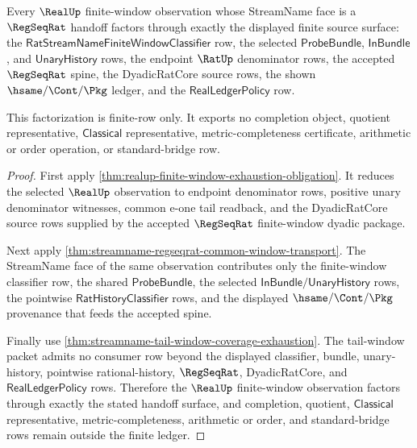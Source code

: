 \begin{theorem}
\label{thm:realup-streamname-regseqrat-dyadic-handoff-exhaustion}
Every $\RealUp$ finite-window observation whose StreamName face is a
$\RegSeqRat$ handoff factors through exactly the displayed finite source
surface: the $\mathsf{RatStreamNameFiniteWindowClassifier}$ row, the selected
$\mathsf{ProbeBundle}$, $\mathsf{InBundle}$, and $\mathsf{UnaryHistory}$ rows,
the endpoint $\RatUp$ denominator rows, the accepted $\RegSeqRat$ spine, the
DyadicRatCore source rows, the shown $\hsame/\Cont/\Pkg$ ledger, and the
$\mathsf{RealLedgerPolicy}$ row.

This factorization is finite-row only. It exports no completion object,
quotient representative, $\mathsf{Classical}$ representative,
metric-completeness certificate, arithmetic or order operation, or
standard-bridge row.
\end{theorem}
\begin{proof}
First apply \autoref{thm:realup-finite-window-exhaustion-obligation}. It
reduces the selected $\RealUp$ observation to endpoint denominator rows,
positive unary denominator witnesses, common e-one tail readback, and the
DyadicRatCore source rows supplied by the accepted $\RegSeqRat$ finite-window
dyadic package.

Next apply \autoref{thm:streamname-regseqrat-common-window-transport}. The
StreamName face of the same observation contributes only the finite-window
classifier row, the shared $\mathsf{ProbeBundle}$, the selected
$\mathsf{InBundle}/\mathsf{UnaryHistory}$ rows, the pointwise
$\mathsf{RatHistoryClassifier}$ rows, and the displayed
$\hsame/\Cont/\Pkg$ provenance that feeds the accepted spine.

Finally use \autoref{thm:streamname-tail-window-coverage-exhaustion}. The
tail-window packet admits no consumer row beyond the displayed classifier,
bundle, unary-history, pointwise rational-history, $\RegSeqRat$,
DyadicRatCore, and $\mathsf{RealLedgerPolicy}$ rows. Therefore the
$\RealUp$ finite-window observation factors through exactly the stated handoff
surface, and completion, quotient, $\mathsf{Classical}$ representative,
metric-completeness, arithmetic or order, and standard-bridge rows remain
outside the finite ledger.
\end{proof}

